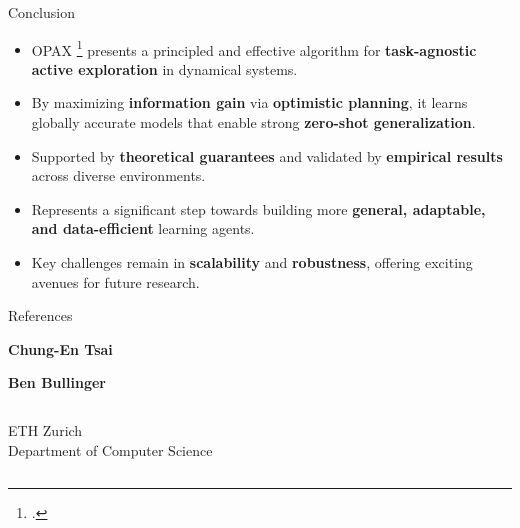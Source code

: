 \documentclass[11pt,aspectratio=169]{beamer}
\begin{document}
\begin{frame}{Conclusion}
    \begin{itemize}
        \item OPAX \footcite{sukhija2023optimistic} presents a principled and effective algorithm for \textbf{task-agnostic active exploration} in dynamical systems.
        \pause
        \item By maximizing \textbf{information gain} via \textbf{optimistic planning}, it learns globally accurate models that enable strong \textbf{zero-shot generalization}.
        \pause
        \item Supported by \textbf{theoretical guarantees} and validated by \textbf{empirical results} across diverse environments.
        \pause
        \item Represents a significant step towards building more \textbf{general, adaptable, and data-efficient} learning agents.
        \pause
        \item Key challenges remain in \textbf{scalability} and \textbf{robustness}, offering exciting avenues for future research.
    \end{itemize}
\end{frame}

\begin{frame}[allowframebreaks]{References} %
    \printbibliography
\end{frame}

\begin{closingframe}

    \begin{center}
        \begin{minipage}{1\textwidth}
            \textbf{Chung-En Tsai}\hfill
            \textit{}
            
            \vspace{0.25em}
            
            \textbf{Ben Bullinger}\hfill\textit{}
        \end{minipage}
    \end{center}

    \vfill

    \begin{columns}
		\begin{column}{\textwidth}
            ETH Zurich\\
            Department of Computer Science
		\end{column}
	\end{columns}

\end{closingframe}
\end{document}
